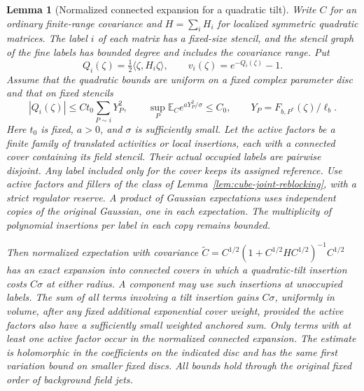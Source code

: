 \documentclass[11pt]{article}
\newtheorem{lemma}[theorem]{Lemma}
\theoremstyle{definition}
\newcommand{\E}{\mathbb E}
\begin{document}
\begin{lemma}[Normalized connected expansion for a quadratic tilt]
\label{lem:dressed-connected-expansion}
Write \(C\) for an ordinary finite-range covariance and
\(H=\sum_i H_i\) for localized symmetric quadratic matrices.
The label \(i\) of each matrix has a fixed-size stencil, and
the stencil graph of the fine labels has bounded degree and
includes the covariance range. Put
\begin{equation}
 Q_i(\zeta)=\tfrac12\langle\zeta,H_i\zeta\rangle,
 \qquad v_i(\zeta)=e^{-Q_i(\zeta)}-1.
\end{equation}
Assume that the quadratic bounds are uniform on a fixed complex
parameter disc and that on fixed stencils
\begin{equation}
 |Q_i(\zeta)|\le C t_0\sum_{P\sim i}Y_P^2,\qquad
 \sup_P\E_C e^{aY_P^2/\sigma}\le C_0,
 \qquad Y_P=F_{b,P^*}(\zeta)/\ell_b .
\end{equation}
Here \(t_0\) is fixed, \(a>0\), and \(\sigma\) is sufficiently
small. Let the active factors be a finite family of translated
activities or local insertions, each with a connected
cover containing its field stencil. Their actual occupied
labels are pairwise disjoint. Any label included only for the
cover keeps its assigned reference. Use active factors and fillers of the class of
Lemma~\ref{lem:cube-joint-reblocking}, with a strict regulator
reserve. A product of Gaussian expectations uses independent
copies of the original Gaussian, one in each expectation. The
multiplicity of polynomial insertions per label in each copy
remains bounded.

Then normalized expectation with covariance
\(\widetilde C=C^{1/2}(1+C^{1/2}HC^{1/2})^{-1}C^{1/2}\)
has an exact expansion into connected covers in which a
quadratic-tilt insertion costs \(C\sigma\) at either radius.
A component may use such insertions at unoccupied labels.
The sum of all terms involving a tilt insertion gains
\(C\sigma\), uniformly in volume, after any fixed additional
exponential cover weight, provided the active factors also
have a sufficiently small weighted anchored sum. Only terms
with at least one active factor occur in the normalized
connected expansion. The estimate is holomorphic in the
coefficients on the indicated disc and has the same first
variation bound on smaller fixed discs. All bounds hold
through the original fixed order of background field jets.
\end{lemma}
\end{document}
